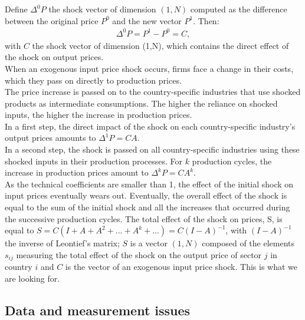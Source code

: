 \documentclass[11pt,a4paper]{article}
\begin{document}
Define ${{\Delta }^{0}}P$ the shock vector of dimension $(1, N)$ computed as the difference between the original price $P^0$ and the new vector $P^1$. Then:
\begin{eqnarray*}
\Delta ^{0}P=P^1-P^0=C, 
\end{eqnarray*}
with $C$ the shock vector of dimension (1,N), which contains the direct effect of the shock on output prices.\\
When an exogenous input price shock occurs, firms face a change in their costs, which they pass on directly to production prices.\\
The price increase is passed on to the country-specific industries that use shocked products as intermediate consumptions. The higher the reliance on shocked inputs, the higher the increase in production prices.\\
In a first step, the direct impact of the shock on each country-specific industry's output prices amounts to $\Delta^{1}P=CA$.\\
In a second step, the shock is passed on all country-specific industries using these shocked inputs in their production processes. For $k$ production cycles, the increase in production prices amount to $\Delta^k P=CA^k$.\\
As the technical coefficients are smaller than 1, the effect of the initial shock on input prices eventually wears out.
Eventually, the overall effect of the shock is equal to the sum of the initial shock and all the increases that occurred during the successive production cycles. The total effect of the shock on prices, S, is equal to $S=C {\left( I+A+A^2+...+A^k+...\right)} =C {\left( I-A \right)}^{-1}$, with ${\left( I-A \right)}^{-1}$ the inverse of Leontief's matrix; $S$ is a vector $(1, N)$ composed of the elements $s_{ij}$ measuring the total effect of the shock on the output price of sector $j$ in country $i$  and $C$ is the vector of an exogenous input price shock. This is what we are looking for.

\subsection{Data and measurement issues}
\label{subsec:data}
\end{document}
